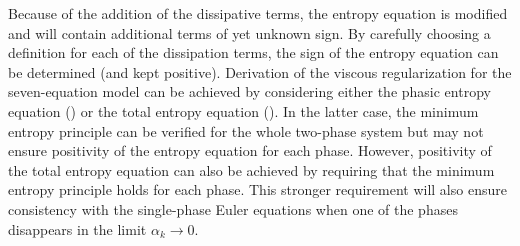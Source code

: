 Because of the addition of the dissipative terms, the entropy equation is modified and will contain additional terms of yet unknown sign. By carefully choosing 
a definition for each of the dissipation terms, the sign of the entropy equation can be determined (and kept positive). Derivation of the viscous 
regularization for the seven-equation model can be achieved by considering either the phasic entropy equation () or the 
total entropy equation (). In the latter case, the minimum entropy principle can be verified for the whole two-phase system 
but may not ensure positivity of the entropy equation for each phase. However, positivity of the total entropy equation can also be achieved by requiring 
that the minimum entropy principle holds for each phase. This stronger requirement will also ensure consistency with the single-phase Euler equations when 
one of the phases disappears in the limit $\alpha_k \to 0$. 
%
